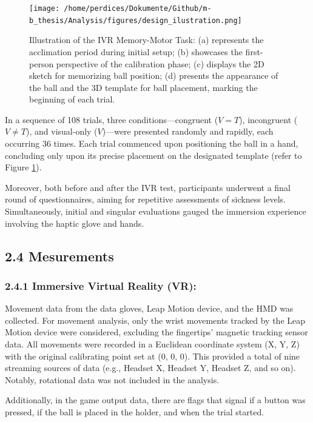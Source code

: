 \documentclass[12pt,oneside,openright]{report}
\begin{document}
\begin{figure}[!ht]
    \centering
    \texttt{[image: /home/perdices/Dokumente/Github/m-b\_thesis/Analysis/figures/design\_ilustration.png]}
    \caption{Illustration of the IVR Memory-Motor Task: (a) represents the acclimation period during initial setup; (b) showcases the first-person perspective of the calibration phase; (c) displays the 2D sketch for memorizing ball position; (d) presents the appearance of the ball and the 3D template for ball placement, marking the beginning of each trial.}
    \label{fig:looks}
\end{figure}
 
In a sequence of 108 trials, three conditions—congruent ($V=T$), incongruent ($V \neq T$), and visual-only ($V$)—were presented randomly and rapidly, each occurring 36 times. Each trial commenced upon positioning the ball in a hand, concluding only upon its precise placement on the designated template (refer to Figure \ref{fig:looks}).

Moreover, both before and after the IVR test, participants underwent a final round of questionnaires, aiming for repetitive assessments of sickness levels. Simultaneously, initial and singular evaluations gauged the immersion experience involving the haptic glove and hands.


\subsection*{2.4 Mesurements}
\subsubsection*{2.4.1 Immersive Virtual Reality (VR):}

 Movement data from the data gloves, Leap Motion device, and the HMD was collected. For movement analysis, only the wrist movements tracked by the Leap Motion device were considered, excluding the fingertips' magnetic tracking sensor data. All movements were recorded in a Euclidean coordinate system (X, Y, Z) with the original calibrating point set at (0, 0, 0). This provided a total of nine streaming sources of data (e.g., Headset X, Headset Y, Headset Z, and so on). Notably, rotational data was not included in the analysis.

Additionally, in the game output data, there are flags that signal if a button was pressed, if the ball is placed in the holder, and when the trial started.
\end{document}
